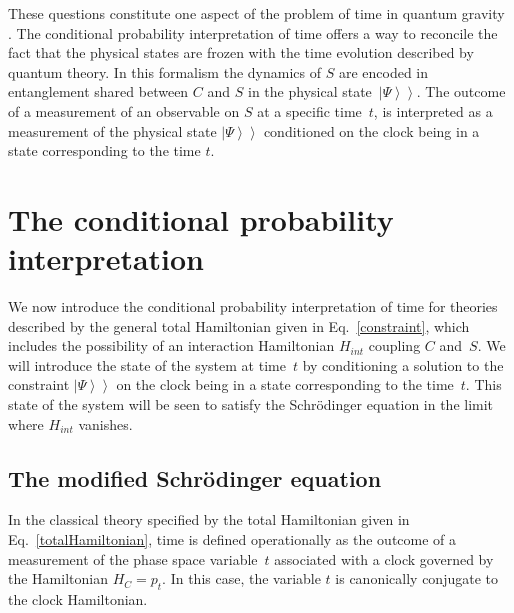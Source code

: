 \documentclass[a4paper,twocolumn,superscriptaddress,11pt,accepted=2019-06-04]{quantumarticle}
\newcommand{\kket}[1]{\left| \left. #1 \right> \right>} 		%
\begin{document}
These questions constitute one aspect of the problem of time in quantum gravity \cite{Isham1993, Kuchar:2011}. The conditional probability interpretation of time offers a way to reconcile the fact that the physical states are frozen with the time evolution  described by quantum theory. In this formalism the dynamics of $S$ are encoded in entanglement shared between $C$ and $S$ in the physical state~$\kket{\Psi}$. The outcome of a measurement of an observable on $S$ at a specific time~$t$, is interpreted as a measurement of the physical state $\kket{\Psi}$ conditioned on the clock being in a state corresponding to the time $t$.



\section{The conditional probability interpretation}
\label{The conditional probability interpretation of time}

We now introduce the conditional probability interpretation of time for theories described by the general total Hamiltonian given in Eq.~\eqref{constraint}{, which includes the possibility of an interaction Hamiltonian $H_{int}$ coupling $C$ and~$S$}. We will introduce the state of the system at time~$t$ by conditioning a solution to the constraint $\kket{\Psi}$ on the clock being in a state corresponding to the time~$t$. This state of the system will be seen to satisfy the Schr\"{o}dinger equation in the limit where $H_{int}$ vanishes.

\subsection{The modified Schr\"{o}dinger equation}
\label{TheModifiedSchrodingerEquation}

In the classical theory specified by the total Hamiltonian given in Eq.~\eqref{totalHamiltonian}, time is defined operationally as the outcome of a measurement of the phase space variable~$t$ associated with a clock governed by the Hamiltonian  $H_C = p_t$. In this case, the variable $t$ is canonically  conjugate to the clock Hamiltonian.
\end{document}
